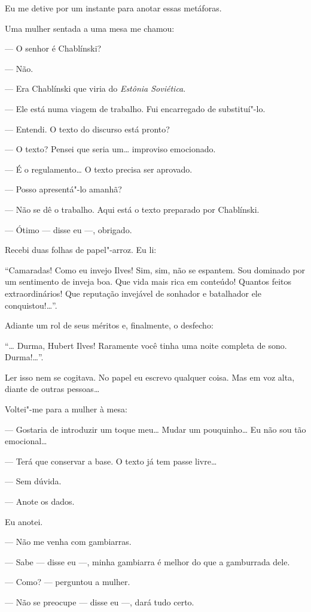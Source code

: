 Eu me detive por um instante para anotar essas metáforas.

Uma mulher sentada a uma mesa me chamou:

--- O senhor é Chablínski?

--- Não.

--- Era Chablínski que viria do \emph{Estônia Soviética}.

--- Ele está numa viagem de trabalho. Fui encarregado de substituí"-lo.

--- Entendi. O texto do discurso está pronto?

--- O texto? Pensei que seria um\ldots{} improviso emocionado.

--- É o regulamento\ldots{} O texto precisa ser aprovado.

--- Posso apresentá"-lo amanhã?

--- Não se dê o trabalho. Aqui está o texto preparado por Chablínski.

--- Ótimo --- disse eu ---, obrigado.

Recebi duas folhas de papel"-arroz. Eu li:

``Camaradas! Como eu invejo Ilves! Sim, sim, não se espantem. Sou
dominado por um sentimento de inveja boa. Que vida mais rica em
conteúdo! Quantos feitos extraordinários! Que reputação invejável de
sonhador e batalhador ele conquistou!\ldots{}''.

Adiante um rol de seus méritos e, finalmente, o desfecho:

``\ldots{} Durma, Hubert Ilves! Raramente você tinha uma noite completa de
sono. Durma!\ldots{}''.

Ler isso nem se cogitava. No papel eu escrevo qualquer coisa. Mas em voz
alta, diante de outras pessoas\ldots{}

Voltei"-me para a mulher à mesa:

--- Gostaria de introduzir um toque meu\ldots{} Mudar um pouquinho\ldots{} Eu não
sou tão emocional\ldots{}

--- Terá que conservar a base. O texto já tem passe livre\ldots{}

--- Sem dúvida.

--- Anote os dados.

Eu anotei.

--- Não me venha com gambiarras.

--- Sabe --- disse eu ---, minha gambiarra é melhor do que a gamburrada
dele.

--- Como? --- perguntou a mulher.

--- Não se preocupe --- disse eu ---, dará tudo certo.

